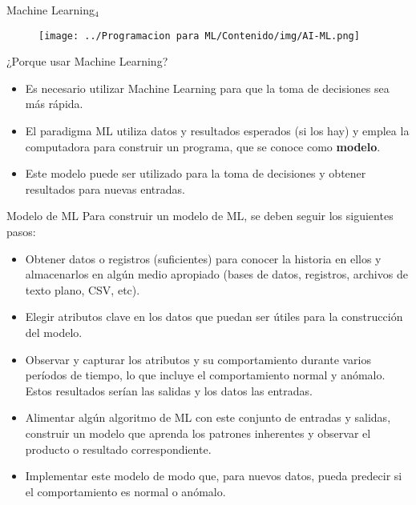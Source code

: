 \documentclass[11pt,aspectratio=169]{beamer}
\begin{document}
\begin{frame}{Machine Learning$_4$}
\begin{figure}[H]
	\centering
	\texttt{[image: ../Programacion para ML/Contenido/img/AI-ML.png]}
\end{figure}
\end{frame}

\begin{frame}{¿Porque usar Machine Learning?}
\begin{itemize}
	\item Es necesario utilizar Machine Learning para que la toma de decisiones sea más rápida.\pause
	\item El paradigma ML utiliza datos y resultados esperados (si los hay) y emplea la computadora para construir un programa, que se 
		conoce como \textbf{modelo}.\pause
	\item Este modelo puede ser utilizado para la toma de decisiones y obtener resultados para nuevas entradas.
\end{itemize}
\end{frame}

\begin{frame}{Modelo de ML}
Para construir un modelo de ML, se deben seguir los siguientes pasos:\pause
\begin{itemize}
	\item Obtener datos o registros (suficientes) para conocer la historia en ellos y almacenarlos en algún medio apropiado 
		(bases de datos, registros, archivos de texto plano, CSV, etc). \pause
	\item Elegir atributos clave en los datos que puedan ser útiles para la construcción del modelo. \pause
	\item Observar y capturar los atributos y su comportamiento durante varios períodos de tiempo, lo que incluye el comportamiento normal y anómalo. \pause
		Estos resultados serían las salidas y los datos las entradas.\pause
	\item Alimentar algún algoritmo de ML con este conjunto de entradas y salidas, construir un modelo que aprenda los patrones inherentes 
		y observar el producto o resultado correspondiente.\pause
	\item Implementar este modelo de modo que, para nuevos datos, pueda predecir si el comportamiento es normal o anómalo.
\end{itemize}
\end{frame}
\end{document}
